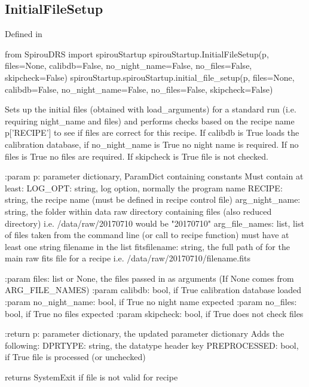 \noindent\begin{minipage}{\textwidth}
\subsection{InitialFileSetup}

Defined in \spirouStartup{}

\begin{pythonbox}
from SpirouDRS import spirouStartup
spirouStartup.InitialFileSetup(p, files=None, calibdb=False, no_night_name=False,
                               no_files=False, skipcheck=False)
spirouStartup.spirouStartup.initial_file_setup(p, files=None, calibdb=False, 
                                               no_night_name=False, no_files=False, skipcheck=False)
\end{pythonbox}

\begin{pythondocstring}
Sets up the initial files (obtained with load_arguments) for a standard run
 (i.e. requiring night_name and files) and performs checks based on the
 recipe name p['RECIPE'] to see if files are correct for this recipe. If
 calibdb is True loads the calibration database, if no_night_name is True
 no night name is required. If no files is True no files are required. If
 skipcheck is True file is not checked.

:param p: parameter dictionary, ParamDict containing constants
    Must contain at least:
        LOG_OPT: string, log option, normally the program name
        RECIPE: string, the recipe name (must be defined in recipe control
                file)
        arg_night_name: string, the folder within data raw directory
                        containing files (also reduced directory) i.e.
                        /data/raw/20170710 would be "20170710"
        arg_file_names: list, list of files taken from the command line
                        (or call to recipe function) must have at least
                        one string filename in the list
        fitsfilename: string, the full path of for the main raw fits
                      file for a recipe
                      i.e. /data/raw/20170710/filename.fits
                          
:param files: list or None, the files passed in as arguments 
              (If None comes from ARG_FILE_NAMES) 
:param calibdb: bool, if True calibration database loaded
:param no_night_name: bool, if True no night name expected
:param no_files: bool, if True no files expected
:param skipcheck: bool, if True does not check files


:return p: parameter dictionary, the updated parameter dictionary
        Adds the following:
            DPRTYPE: string, the datatype header key
            PREPROCESSED: bool, if True file is processed (or unchecked)
            
returns SystemExit if file is not valid for recipe
\end{pythondocstring}
\end{minipage}

